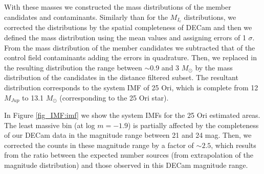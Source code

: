 \documentclass[12pt]{article}
\begin{document}
With these masses we constructed the mass distributions of the member candidates and contaminants. Similarly than for the $M_{I_c}$ distributions, we corrected the distributions by the spatial completeness of DECam and then we defined the mass distribution using the mean values and assigning errors of 1 $\sigma$. From the mass distribution of the member candidates we subtracted that of the control field contaminants adding the errors in quadrature. Then, we replaced in the resulting distribution the range between $\sim$0.9 and 3 $M_\odot$ by the mass distribution of the candidates in the distance filtered subset. The resultant distribution corresponds to the system IMF of 25 Ori, which is complete from 12 $M_{Jup}$ to 13.1 $M_\odot$ (corresponding to the 25 Ori star).

In Figure \ref{fig_IMF:imf} we show the system IMFs for the 25 Ori estimated areas. The least massive bin (at log $m=-1.9$) is partially affected by the completeness of our DECam data in the magnitude range between 21 and 24 mag. Then, we corrected the counts in these magnitude range by a factor of $\sim2.5$, which results from the ratio between the expected number sources (from extrapolation of the magnitude distribution) and those observed in this DECam magnitude range.
\end{document}
